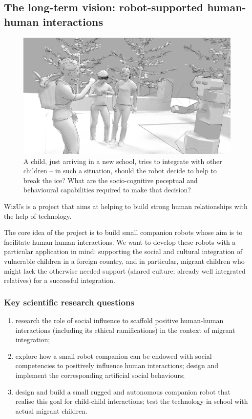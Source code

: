 \documentclass[11pt,a4paper]{report}
\newcommand{\project}{WizUs\xspace}
\begin{document}
\subsection{The long-term vision: robot-supported human-human interactions}


\begin{figure}
\centering
\includegraphics[width=0.9\linewidth]{figs/rHHI-1}
\caption{A child, just arriving in a new school, tries to integrate with other
    children -- in such a situation, should the robot decide to help to break the ice? What
    are the socio-cognitive peceptual and behavioural capabilities required to
    make that decision?}
\label{fig:rHHI}
\end{figure}


\project is a project that aims at helping to build strong human
relationships with the help of technology.

The core idea of the project is to build small companion robots whose
aim is to facilitate human-human interactions. We want to develop these
robots with a particular application in mind: supporting the social and
cultural integration of vulnerable children in a foreign country, and in
particular, migrant children who might lack the otherwise needed support
(shared culture; already well integrated relatives) for a successful
integration.

\subsubsection{Key scientific research questions}

\begin{enumerate}
\item research the role of social influence to scaffold positive human-human
    interactions (including its ethical ramifications) in the context of migrant
    integration;
\item explore how a small robot companion can be endowed with social
    competencies to positively influence human interactions; design and
    implement the corresponding artificial social behaviours;
\item design and build a small rugged and autonomous companion robot that
    realise this goal for child-child interactions; test the technology in
    school with actual migrant children.
\end{enumerate}
\end{document}
